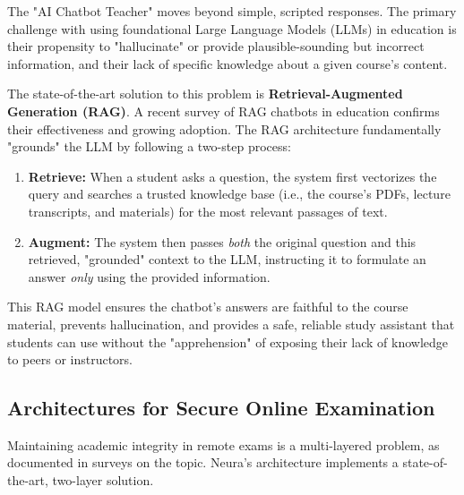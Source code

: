 The "AI Chatbot Teacher" moves beyond simple, scripted responses. The primary challenge with using foundational Large Language Models (LLMs) in education is their propensity to "hallucinate" or provide plausible-sounding but incorrect information, and their lack of specific knowledge about a given course's content.\cite{lewis2020rag}

The state-of-the-art solution to this problem is \textbf{Retrieval-Augmented Generation (RAG)}.\cite{lewis2020rag} A recent survey of RAG chatbots in education confirms their effectiveness and growing adoption.\cite{rag_survey} The RAG architecture fundamentally "grounds" the LLM by following a two-step process:
\begin{enumerate}
    \item \textbf{Retrieve:} When a student asks a question, the system first vectorizes the query and searches a trusted knowledge base (i.e., the course's PDFs, lecture transcripts, and materials) for the most relevant passages of text.\cite{rag_vector_db}
    \item \textbf{Augment:} The system then passes \textit{both} the original question and this retrieved, "grounded" context to the LLM, instructing it to formulate an answer \textit{only} using the provided information.\cite{lewis2020rag, rag_chatbot}
\end{enumerate}

This RAG model ensures the chatbot's answers are faithful to the course material, prevents hallucination, and provides a safe, reliable study assistant that students can use without the "apprehension" of exposing their lack of knowledge to peers or instructors.\cite{rag_survey}

\subsection{Architectures for Secure Online Examination}

Maintaining academic integrity in remote exams is a multi-layered problem, as documented in surveys on the topic.\cite{proctor_su, proctor_survey_methods} Neura's architecture implements a state-of-the-art, two-layer solution.

